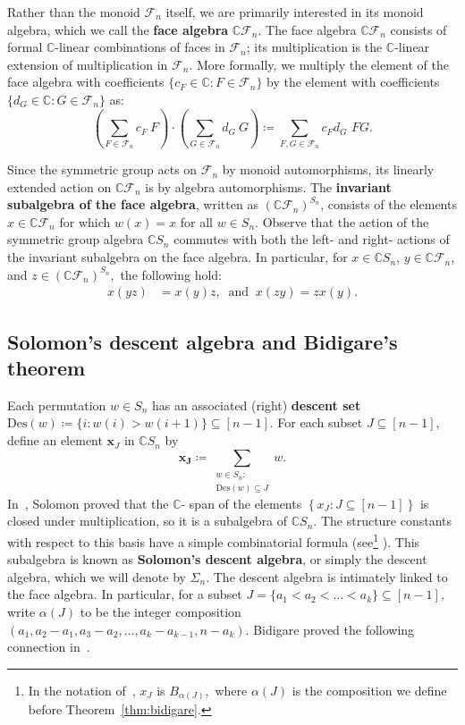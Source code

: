\documentclass[ALCO, Unicode]{cedram}
\def\C{{\mathbb{C}}}
\begin{document}
Rather than the monoid $\mathcal{F}_n$ itself, we are primarily interested in its monoid algebra, which we call the \textbf{face algebra} $\mathbb{C}\mathcal{F}_n$. The face algebra $\mathbb{C}\mathcal{F}_n$ consists of formal $\C$-linear combinations of faces in $\mathcal{F}_n$; its multiplication is the $\C$-linear extension of multiplication in $\mathcal{F}_n$. More formally, we multiply the element of the face algebra with coefficients $\{c_F \in \C : F \in \mathcal{F}_n\}$ by the element with coefficients $\{d_G \in \C: G \in \mathcal{F}_n\}$ as:
\[\left(\sum_{F \in \mathcal{F}_n}c_F \ F \right)\cdot \left(\sum_{G \in \mathcal{F}_n}d_G  \ G\right)  \coloneqq  \sum_{F, G \in \mathcal{F}_n}c_Fd_G \,\, F G.\]

Since the symmetric group acts on $\mathcal{F}_n$ by monoid automorphisms, its linearly extended action on $\mathbb{C}\mathcal{F}_n$ is by algebra automorphisms. The \textbf{invariant subalgebra of the face algebra}, written as \textbf{$\left(\C \mathcal{F}_n \right)^{S_n}$}, consists of the elements $x \in \C \mathcal{F}_n$ for which $w(x) = x$ for all $w \in S_n.$ Observe that the action of the symmetric group algebra \textbf{$\C S_n$} commutes with both the left- and right- actions of the invariant subalgebra on the face algebra. In particular, for $x \in \C S_n$, $y \in \C \mathcal{F}_n$, and $z \in \left(\C \mathcal{F}_n \right)^{S_n},$  the following hold: 
\begin{align} \label{lem:commuting-action}
        x(y z) &= x(y) z, \  \text{ and } \ 
        x(z y) = z x(y).
\end{align}


\subsection{Solomon's descent algebra and Bidigare's theorem}
Each permutation  $w \in S_n$ has an associated (right) \textbf{descent set} $\mathrm{Des}(w)  \coloneqq  \{i: w(i) > w(i + 1)\}\subseteq [n - 1].$ For each subset $J \subseteq [n - 1]$, define an element $\mathbf{x}_J$ in $\C S_n$ by \[\mathbf{x_J}  \coloneqq  \sum_{\substack{w \in S_n:\\ \mathrm{Des}(w) \subseteq J}}w.\] In~\cite{Solomondescentbirth}, Solomon {proved}
that the  $\C$- span of the elements $\left \{x_J: J \subseteq [n- 1]\right\}$ is closed under multiplication, so it is a subalgebra of $\mathbb{C}S_n.$ The structure constants with respect to this basis have a simple combinatorial formula (see\footnote{In the notation of~\cite{garsia-reutenauer}, $x_J$ is $B_{\alpha(J)},$ where $\alpha(J)$ is the composition we define before Theorem~\ref{thm:bidigare}.} {\cite[Proposition 1.1]{garsia-reutenauer}}). This subalgebra is 
known as \textbf{Solomon's descent algebra}, or simply the descent algebra, which we will denote by \textbf{$\Sigma_n$}. The descent algebra is intimately linked to the face algebra. In particular, for a subset $J = \{a_1<a_2 < \ldots < a_k\} \subseteq [n - 1],$ write ${\alpha(J)}$ to be the integer composition $(a_1, a_2 - a_1, a_3 - a_2, \ldots, a_k - a_{k - 1}, n - a_k).$ Bidigare proved the following connection in~\cite[Theorem 3.8.1]{Bidigare}.
\end{document}
